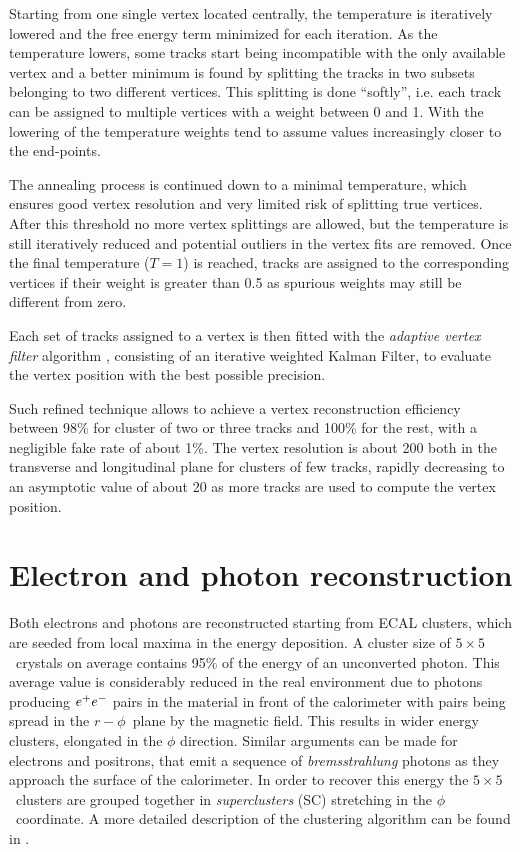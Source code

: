 Starting from one single vertex located centrally, the temperature is iteratively lowered and the free energy term minimized for each iteration. As the temperature lowers, some tracks start being incompatible with the only available vertex and a better minimum is found by splitting the tracks in two subsets belonging to two different vertices. This splitting is done ``softly'', i.e. each track can be assigned to multiple vertices with a weight between 0 and 1. With the lowering of the temperature weights tend to assume values increasingly closer to the end-points.

The annealing process is continued down to a minimal temperature, which ensures good vertex resolution and very limited risk of splitting true vertices. After this threshold no more vertex splittings are allowed, but the temperature is still iteratively reduced and potential outliers in the vertex fits are removed. Once the final temperature ($T=1$) is reached, tracks are assigned to the corresponding vertices if their weight is greater than 0.5 as spurious weights may still be different from zero. 

Each set of tracks assigned to a vertex is then fitted with the \emph{adaptive vertex filter} algorithm \cite{CMS_NOTE_2007-008}, consisting of an iterative weighted Kalman Filter, to evaluate the vertex position with the best possible precision.

Such refined technique allows to achieve a vertex reconstruction efficiency between 98\% for cluster  of two or three tracks and 100\% for the rest, with a negligible fake rate of about 1\%. The vertex resolution is about 200 \um both in the transverse and longitudinal plane for clusters of few tracks, rapidly decreasing to an asymptotic value of about 20 \um as more tracks are used to compute the vertex position.

\section{Electron and photon reconstruction}

Both electrons and photons are reconstructed starting from ECAL clusters, which are seeded from local maxima in the energy deposition. A cluster size of $5\times5$\ crystals on average contains 95\% of the energy of an unconverted photon. This average value is considerably reduced in the real environment due to photons producing $e^{+}e^{-}$ pairs in the material in front of the calorimeter with pairs being spread in the $r-\phi$\ plane by the magnetic field. This results in wider energy clusters, elongated in the $\phi$ direction. Similar arguments can be made for electrons and positrons, that emit a sequence of \emph{bremsstrahlung} photons as they approach the surface of the calorimeter. In order to recover this energy the $5\times5$\ clusters are grouped together in \emph{superclusters} (SC) stretching in the $\phi$\ coordinate. A more detailed description of the clustering algorithm can be found in \cite{CMS:2006tdr1}.

